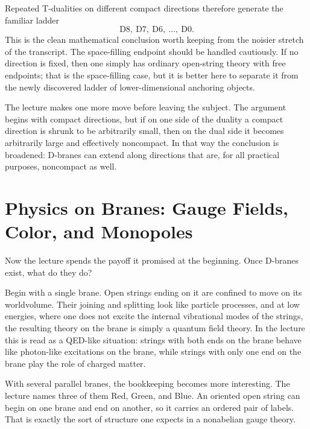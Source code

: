Repeated T-dualities on different compact directions therefore generate the familiar ladder
\begin{equation}
\mathrm{D}8,\ \mathrm{D}7,\ \mathrm{D}6,\ \dots,\ \mathrm{D}0.
\end{equation}
This is the clean mathematical conclusion worth keeping from the noisier stretch of the transcript. The space-filling endpoint should be handled cautiously. If no direction is fixed, then one simply has ordinary open-string theory with free endpoints; that is the space-filling case, but it is better here to separate it from the newly discovered ladder of lower-dimensional anchoring objects.

The lecture makes one more move before leaving the subject. The argument begins with compact directions, but if on one side of the duality a compact direction is shrunk to be arbitrarily small, then on the dual side it becomes arbitrarily large and effectively noncompact. In that way the conclusion is broadened: D-branes can extend along directions that are, for all practical purposes, noncompact as well.

\section{Physics on Branes: Gauge Fields, Color, and Monopoles}

Now the lecture spends the payoff it promised at the beginning. Once D-branes exist, what do they do?

Begin with a single brane. Open strings ending on it are confined to move on its worldvolume. Their joining and splitting look like particle processes, and at low energies, where one does not excite the internal vibrational modes of the strings, the resulting theory on the brane is simply a quantum field theory. In the lecture this is read as a QED-like situation: strings with both ends on the brane behave like photon-like excitations on the brane, while strings with only one end on the brane play the role of charged matter.

With several parallel branes, the bookkeeping becomes more interesting. The lecture names three of them Red, Green, and Blue. An oriented open string can begin on one brane and end on another, so it carries an ordered pair of labels. That is exactly the sort of structure one expects in a nonabelian gauge theory.

